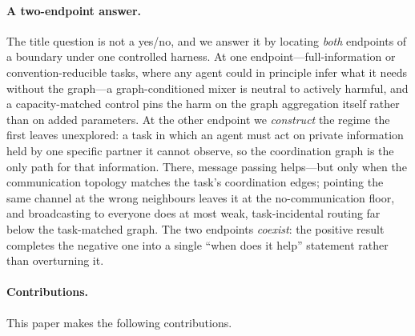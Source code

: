 \documentclass[manuscript, screen, review]{jair}
\begin{document}
\paragraph{A two-endpoint answer.} The title question is not a yes/no, and we
answer it by locating \emph{both} endpoints of a boundary under one
controlled harness. At one endpoint---full-information or
convention-reducible tasks, where any agent could in principle infer what it
needs without the graph---a graph-conditioned mixer is neutral to actively
harmful, and a capacity-matched control pins the harm on the graph
aggregation itself rather than on added parameters. At the other endpoint we
\emph{construct} the regime the first leaves unexplored: a task in which an
agent must act on private information held by one specific partner it cannot
observe, so the coordination graph is the only path for that information.
There, message passing helps---but only when the communication topology
matches the task's coordination edges; pointing the same channel at the
wrong neighbours leaves it at the no-communication floor, and broadcasting to
everyone does at most weak, task-incidental routing far below the task-matched
graph. The two
endpoints \emph{coexist}: the positive result completes the negative one
into a single ``when does it help'' statement rather than overturning it.

\paragraph{Contributions.} This paper makes the following contributions.
\end{document}
